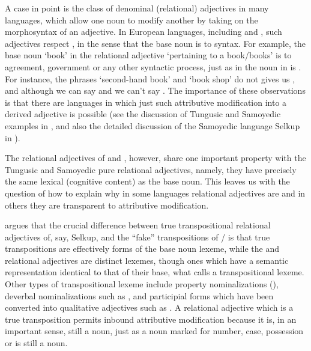 \documentclass[output=paper,
modfonts
]{LSP/langsci}
\begin{document}
A case in point is the class of denominal (relational) adjectives in many languages, which allow one noun to modify another by taking on the morphosyntax of an adjective. In European languages, including  and , %
such adjectives respect , in the sense that the base noun is   to syntax. For example, the base noun  ‘book’ in the  relational adjective  ‘pertaining to a book/books’ is  to agreement, government or any other syntactic process, just as in   the noun  in  is . For instance, the phrases  ‘second-hand book’ and  ‘book shop’ do not gives us , and although we can say  and  we can’t say . The importance of these observations is that there are languages  in which just such attributive modification into a derived adjective is possible  (see the discussion of Tungusic and Samoyedic examples in \cite{Nikolaeva08}, and also the detailed discussion of the Samoyedic language Selkup %
in \citealt[Chapter 10]{Spencer13:book}).

The relational adjectives of  and , however, share  one important property with the Tungusic and Samoyedic  pure relational adjectives, namely, they have precisely the same lexical  (cognitive content) as the base noun. This leaves us with the question of how to explain why in some languages relational adjectives are  and in others they are transparent to attributive modification.   

\citet{Spencer13:book} argues that the crucial difference between true transpositional relational adjectives of, say, Selkup,  and the ``fake'' transpositions of / is that true transpositions are effectively forms of the base noun lexeme, while the  and  relational adjectives are distinct lexemes, though ones which have a semantic representation identical to that of their base, what \citet[275]{Spencer13:book} calls a transpositional lexeme. Other types of transpositional lexeme include  property nominalizations (), deverbal nominalizations such as , and participial forms which have been converted into qualitative adjectives such as .  A relational adjective which is a true transposition permits inbound attributive modification because it is, in an important sense, still a noun, just as a noun  marked for number, case, possession or  is still a noun. 
\end{document}
